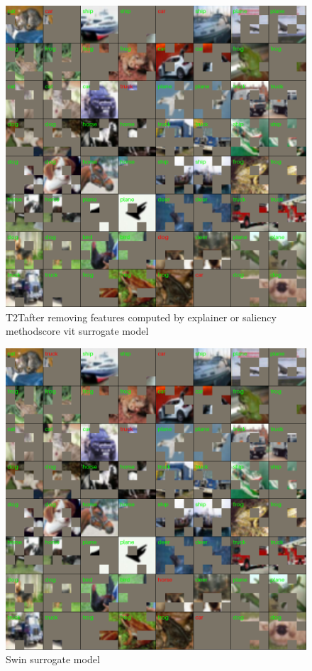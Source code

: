 \documentclass[magisterska,en]{pracamgr}
\begin{document}
\begin{figure}[H]
\centering
\includegraphics[scale=0.5]{./images/t2t_vit_surrogate_masks.png}
\caption{T2T\textdel after removing features computed by explainer or saliency methodscore vit surrogate model}
\label{t2t_vit_surrogate_masks}
\end{figure}


\begin{figure}[H]
\centering
\includegraphics[scale=0.5]{./images/swin_surrogate_masks.png}
\caption{Swin surrogate model}
\label{swin_surrogate_masks}
\end{figure}
\end{document}
